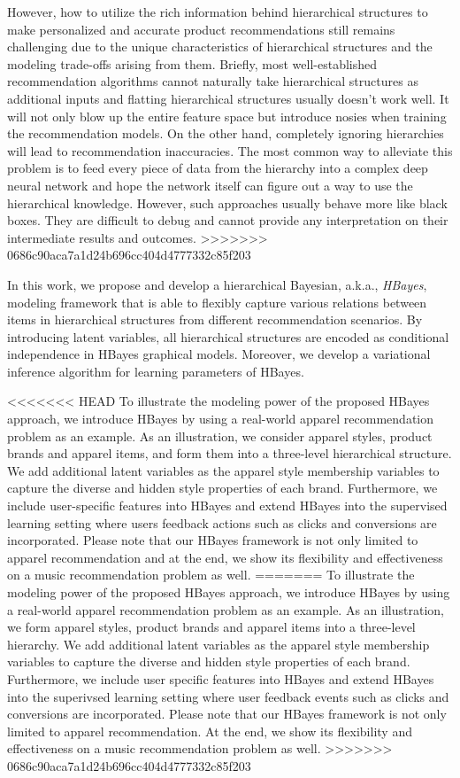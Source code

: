 However, how to utilize the rich information behind hierarchical structures to make personalized and accurate product recommendations still remains challenging due to the unique characteristics of hierarchical structures and the modeling trade-offs arising from them. Briefly, most well-established recommendation algorithms cannot naturally take hierarchical structures as additional inputs and flatting hierarchical structures usually doesn't work well. It will not only blow up the entire feature space but introduce nosies when training the recommendation models. On the other hand, completely ignoring hierarchies will lead to recommendation inaccuracies. The most common way to alleviate this problem is to feed every piece of data from the hierarchy into a complex deep neural network and hope the network itself can figure out a way to use the hierarchical knowledge. However, such approaches usually behave more like black boxes. They are difficult to debug and cannot provide any interpretation on their intermediate results and outcomes.
>>>>>>> 0686c90aca7a1d24b696cc404d4777332c85f203

In this work, we propose and develop a hierarchical Bayesian, a.k.a., \emph{HBayes}, modeling framework that is able to flexibly capture various relations between items in hierarchical structures from different recommendation scenarios. By introducing latent variables, all hierarchical structures are encoded as conditional independence in HBayes graphical models. Moreover, we develop a variational inference algorithm for learning parameters of HBayes. 

<<<<<<< HEAD
To illustrate the modeling power of the proposed HBayes approach, we introduce HBayes by using a real-world apparel recommendation problem as an example. As an illustration, we consider apparel styles, product brands and apparel items,  and form them into a three-level hierarchical structure. We add additional latent variables as the apparel style membership variables to capture the diverse and hidden style properties of each brand. Furthermore, we include user-specific features into HBayes and extend HBayes into the supervised learning setting where users feedback actions such as clicks and conversions are incorporated. Please note that our HBayes framework is not only limited to apparel recommendation and at the end, we show its flexibility and effectiveness on a music recommendation problem as well.
=======
To illustrate the modeling power of the proposed HBayes approach, we introduce HBayes by using a real-world apparel recommendation problem as an example. As an illustration, we form apparel styles, product brands and apparel items into a three-level hierarchy. We add additional latent variables as the apparel style membership variables to capture the diverse and hidden style properties of each brand. Furthermore, we include user specific features into HBayes and extend HBayes into the superivsed learning setting where user feedback events such as clicks and conversions are incorporated. Please note that our HBayes framework is not only limited to apparel recommendation. At the end, we show its flexibility and effectiveness on a music recommendation problem as well.
>>>>>>> 0686c90aca7a1d24b696cc404d4777332c85f203

